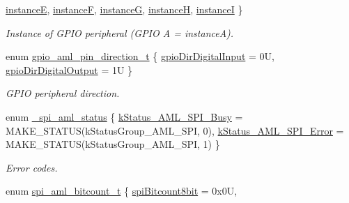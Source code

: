 \begin{DoxyCompactItemize}
\newline
\mbox{\hyperlink{group__enum__group_gga325a66c5aefcf2c26cd0234c7e4bb0efac17c5c16669ab8617154c2bd03d83ac9}{instanceE}}, 
\mbox{\hyperlink{group__enum__group_gga325a66c5aefcf2c26cd0234c7e4bb0efa8d31a623541a846a1231809fd28fedf7}{instanceF}}, 
\mbox{\hyperlink{group__enum__group_gga325a66c5aefcf2c26cd0234c7e4bb0efa464d561741298e4a1c64a2206ec4eb2e}{instanceG}}, 
\mbox{\hyperlink{group__enum__group_gga325a66c5aefcf2c26cd0234c7e4bb0efa7706a05384e9902f15608c4c95fc08f4}{instanceH}}, 
\newline
\mbox{\hyperlink{group__enum__group_gga325a66c5aefcf2c26cd0234c7e4bb0efa857bfe4f3ccd89d4acba0823c310a71f}{instanceI}}
 \}
\begin{DoxyCompactList}\small\item\em Instance of G\+P\+IO peripheral (G\+P\+IO A = instanceA). \end{DoxyCompactList}\item 
enum \mbox{\hyperlink{group__enum__group_gabdc751b721ec203728375016e2dabc27}{gpio\+\_\+aml\+\_\+pin\+\_\+direction\+\_\+t}} \{ \mbox{\hyperlink{group__enum__group_ggabdc751b721ec203728375016e2dabc27ac792029fc2da8d986431b95c00052657}{gpio\+Dir\+Digital\+Input}} = 0U, 
\mbox{\hyperlink{group__enum__group_ggabdc751b721ec203728375016e2dabc27aab3c655a884dbf7316350ac4cf98614a}{gpio\+Dir\+Digital\+Output}} = 1U
 \}
\begin{DoxyCompactList}\small\item\em G\+P\+IO peripheral direction. \end{DoxyCompactList}\item 
enum \mbox{\hyperlink{group__enum__group_ga7eabcde60f10dd4e678bfafb2c66e618}{\+\_\+spi\+\_\+aml\+\_\+status}} \{ \mbox{\hyperlink{group__enum__group_gga7eabcde60f10dd4e678bfafb2c66e618aee97661a5080945d517bb59648de934e}{k\+Status\+\_\+\+A\+M\+L\+\_\+\+S\+P\+I\+\_\+\+Busy}} = M\+A\+K\+E\+\_\+\+S\+T\+A\+T\+US(k\+Status\+Group\+\_\+\+A\+M\+L\+\_\+\+S\+PI, 0), 
\mbox{\hyperlink{group__enum__group_gga7eabcde60f10dd4e678bfafb2c66e618ab50871cf42253a19dd8ccc1de1561dd7}{k\+Status\+\_\+\+A\+M\+L\+\_\+\+S\+P\+I\+\_\+\+Error}} = M\+A\+K\+E\+\_\+\+S\+T\+A\+T\+US(k\+Status\+Group\+\_\+\+A\+M\+L\+\_\+\+S\+PI, 1)
 \}
\begin{DoxyCompactList}\small\item\em Error codes. \end{DoxyCompactList}\item 
enum \mbox{\hyperlink{group__enum__group_gaf2c0a2911c01ceb543ef11a8f6334764}{spi\+\_\+aml\+\_\+bitcount\+\_\+t}} \{ \mbox{\hyperlink{group__enum__group_ggaf2c0a2911c01ceb543ef11a8f6334764a6e867f2c72aa55914803493c972aedf2}{spi\+Bitcount8bit}} = 0x0U, 

\end{DoxyCompactItemize}
